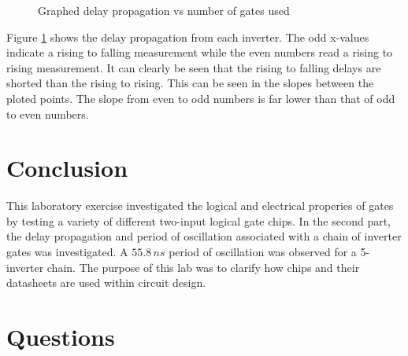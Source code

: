 \documentclass[CMPE]{KGCOEReport}
\begin{document}
\datatable

\begin{figure}[H]
\begin{center}

\caption{Graphed delay propagation vs number of gates used}
\label{fig:delay}
\end{center}
\end{figure}

Figure \ref{fig:delay} shows the delay propagation from each inverter. The odd x-values indicate a rising to falling measurement while the even numbers read a rising to rising measurement. It can clearly be seen that the rising to falling delays are shorted than the rising to rising. This can be seen in the slopes between the ploted points. The slope from even to odd numbers is far lower than that of odd to even numbers.


\section*{Conclusion}

This laboratory exercise investigated the logical and electrical properies of gates by testing a variety of different two-input logical gate chips. In the second part, the delay propagation and period of oscillation associated with a chain of inverter gates was investigated. A $55.8\,ns$ period of oscillation was observed for a 5-inverter chain. The purpose of this lab was to clarify how chips and their datasheets are used within circuit design. 

\section*{Questions}
\end{document}
